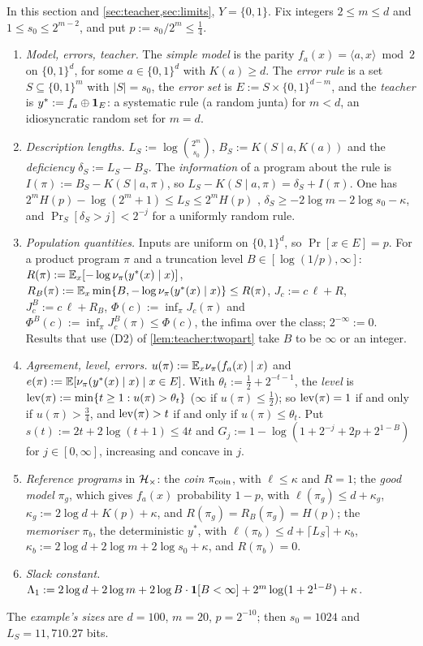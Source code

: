 \begin{definition}\label{def:teacher:instance}
In this section and \cref{sec:teacher,sec:limits}, $Y=\{0,1\}$. Fix integers $2\le m\le d$ and $1\le s_0\le2^{m-2}$, and put $p:=s_0/2^m\le\frac14$.
\begin{enumerate}[label=(\alph*),itemsep=0pt,topsep=2pt]
\item \emph{Model, errors, teacher.} The \emph{simple model} is the parity $f_a(x)=\langle a,x\rangle\bmod2$ on $\{0,1\}^d$, for some $a\in\{0,1\}^d$ with $K(a)\ge d$. The \emph{error rule} is a set $S\subseteq\{0,1\}^m$ with $|S|=s_0$, the \emph{error set} is $E:=S\times\{0,1\}^{d-m}$, and the \emph{teacher} is $y^*:=f_a\oplus\mathbf{1}_E$: a systematic rule (a random junta) for $m<d$, an idiosyncratic random set for $m=d$.
\item \emph{Description lengths.} $L_S:=\log\binom{2^m}{s_0}$, $B_S:=K(S\mid a,K(a))$ and the \emph{deficiency} $\delta_S:=L_S-B_S$. The \emph{information} of a program about the rule is $I(\pi):=B_S-K(S\mid a,\pi)$, so $L_S-K(S\mid a,\pi)=\delta_S+I(\pi)$. One has $2^mH(p)-\log(2^m+1)\le L_S\le2^mH(p)$ \citep{cover2006elements}, $\delta_S\ge-2\log m-2\log s_0-\kappa$, and $\Pr_S[\delta_S>j]<2^{-j}$ for a uniformly random rule.
\item \emph{Population quantities.} Inputs are uniform on $\{0,1\}^d$, so $\Pr[x\in E]=p$. For a product program $\pi$ and a truncation level $B\in[\log(1/p),\infty]$: $R(\pi):=\mathbb{E}_x[-\log\nu_\pi(y^*(x)\mid x)]$, $R_B(\pi):=\mathbb{E}_x\min\{B,-\log\nu_\pi(y^*(x)\mid x)\}\le R(\pi)$, $J_c:=c\,\ell+R$, $J^B_c:=c\,\ell+R_B$, $\Phi(c):=\inf_\pi J_c(\pi)$ and $\Phi^B(c):=\inf_\pi J^B_c(\pi)\le\Phi(c)$, the infima over the class; $2^{-\infty}:=0$. Results that use (D2) of \cref{lem:teacher:twopart} take $B$ to be $\infty$ or an integer.
\item \emph{Agreement, level, errors.} $u(\pi):=\mathbb{E}_x\nu_\pi(f_a(x)\mid x)$ and $e(\pi):=\mathbb{E}[\nu_\pi(y^*(x)\mid x)\mid x\in E]$. With $\theta_t:=\frac12+2^{-t-1}$, the \emph{level} is $\operatorname{lev}(\pi):=\min\{t\ge1:u(\pi)>\theta_t\}$ ($\infty$ if $u(\pi)\le\frac12$); so $\operatorname{lev}(\pi)=1$ if and only if $u(\pi)>\frac34$, and $\operatorname{lev}(\pi)>t$ if and only if $u(\pi)\le\theta_t$. Put $s(t):=2t+2\log(t+1)\le4t$ and $G_j:=1-\log(1+2^{-j}+2p+2^{1-B})$ for $j\in[0,\infty]$, increasing and concave in $j$.
\item \emph{Reference programs} in $\mathcal{H}_{\times}$: the \emph{coin} $\pi_{\rm coin}$, with $\ell\le\kappa$ and $R=1$; the \emph{good model} $\pi_g$, which gives $f_a(x)$ probability $1-p$, with $\ell(\pi_g)\le d+\kappa_g$, $\kappa_g:=2\log d+K(p)+\kappa$, and $R(\pi_g)=R_B(\pi_g)=H(p)$; the \emph{memoriser} $\pi_b$, the deterministic $y^*$, with $\ell(\pi_b)\le d+\lceil L_S\rceil+\kappa_b$, $\kappa_b:=2\log d+2\log m+2\log s_0+\kappa$, and $R(\pi_b)=0$.
\item \emph{Slack constant.} $\Lambda_1:=2\log d+2\log m+2\log B\cdot\mathbf{1}[B<\infty]+2^m\log(1+2^{1-B})+\kappa$.
\end{enumerate}
The \emph{example's sizes} are $d=100$, $m=20$, $p=2^{-10}$; then $s_0=1024$ and $L_S=11{,}710.27$ bits.
\end{definition}

